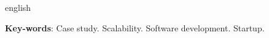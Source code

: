 \begin{resumo}[Abstract]
 \begin{otherlanguage*}{english}
   \vspace{\onelineskip}
 
   \noindent 
   \textbf{Key-words}: Case study. Scalability. Software development. Startup.
 \end{otherlanguage*}
\end{resumo}

